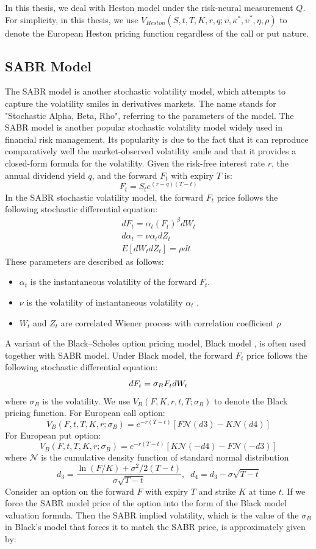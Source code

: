\documentclass[letterpaper,12pt,titlepage,oneside,final]{book}
\numberwithin{equation}{section}
\theoremstyle{definition}
\begin{document}
In this thesis, we deal with Heston model under the risk-neural measurement $Q$. For simplicity, in this thesis,  we use $V_{Heston}(S,t,T,K,r,q;\upsilon,\kappa^*,\overline{\upsilon}^*,\eta,\rho)$ to denote the European Heston pricing function regardless of the call or put nature.
\subsection{SABR Model}
\label{sec:SABR}
The SABR model  \cite{hagan2002managing} is another stochastic volatility model, which attempts to capture the volatility smiles in derivatives markets. The name stands for "Stochastic Alpha, Beta, Rho", referring to the parameters of the model.  The SABR model is another popular stochastic volatility model widely used in financial risk management. Its popularity is due to the fact that it can reproduce comparatively well the market-observed volatility smile and that it provides a closed-form
formula for the volatility. 
Given the risk-free interest rate $r$, the annual dividend yield $q$, and the forward $F_t$ with expiry $T$ is: 
\[
F_t=S_t e^{(r-q) (T-t)}
\]
In the SABR stochastic volatility model, the  forward $F_t$ price follows the following stochastic differential equation:
\[
\begin{split}
dF_t=\alpha_t (F_t)^{\beta}dW_t\\
d\alpha_t=\nu \alpha_t dZ_t\\
E[dW_tdZ_t]=\rho dt
\end{split}
\]
These parameters are described as follows:
\begin{itemize}
	\item $\alpha_t$ is the instantaneous  volatility of the forward $F_t$.
	\item $\nu$ is the   volatility of  instantaneous  volatility $\alpha_t$  .
	\item $W_t$ and $Z_t$ are correlated Wiener process with correlation coefficient $\rho$
\end{itemize}

A variant of the Black–Scholes option pricing model, Black model \cite{black1976pricing}, is often used together with SABR model. Under Black model, the  forward $F_t$ price follows the following stochastic differential equation:
\[
dF_t=\sigma_B F_t dW_t\\
\]
where $\sigma_B$ is the volatility. We use $V_B(F,K,r,t,T;\sigma_{B})$ to denote the Black pricing function. For European call option:
\[
V_B(F,t,T,K,r;\sigma_{B})=e^{-r(T-t)}[F \mathcal{N} (d3)-K  \mathcal{N} (d4)]
\]
For European put option:
\[
V_B(F,t,T,K,r;\sigma_{B})=e^{-r(T-t)}[K  \mathcal{N} (-d4)-F  \mathcal{N} (-d3)]
\]
where $\mathcal{N}$ is the cumulative density function of standard normal distribution
\[
d_3=\frac{\ln(F/K)+\sigma^2/2(T-t)}{\sigma \sqrt{T-t}}, \;\; d_4=d_3-\sigma  \sqrt{T-t}
\]
Consider an option on the forward $F$ with expiry $T$ and strike $K$ at time $t$.
If we force the SABR model price of the option into the form of the Black model valuation formula. Then the SABR implied volatility, which is the value of the $\sigma_B$ in Black's model that forces it to match the SABR price, is approximately given by:
\end{document}
